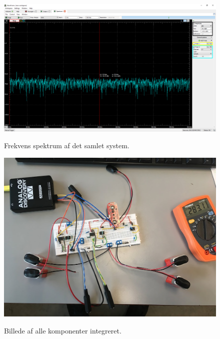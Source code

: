 \begin{figure}[H]
\centering
{\includegraphics[width=\linewidth]
{Figure/integrationstestAAspectrum}}
\caption{Frekvens spektrum af det samlet system. }
\label{fig:integrationstestAAspectrum}
\end{figure} 


\begin{figure}[H]
\centering
{\includegraphics[width=\linewidth]
{Figure/integrationstestBilleder1}}
\caption{Billede af alle komponenter integreret. }
\label{fig:integrationstestBilleder1}
\end{figure} 


